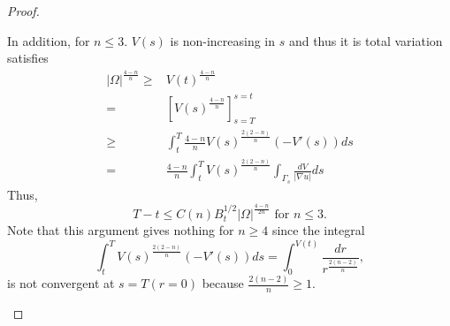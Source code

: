 \documentclass[paper=a4, fontsize=11pt]{scrartcl} %
\numberwithin{equation}{section} %
\numberwithin{figure}{section} %
\numberwithin{table}{section} %
\numberwithin{exercise}{section}
\begin{document}
\begin{proof}
\begin{itemize}
 In addition, for $n\leq 3.$ $V(s)$ is non-increasing in $s$ and thus it is total variation 
 satisfies 
 \begin{align*}
 |\Omega|^{\frac{4-n}{n}} \geq & V(t)^{\frac{4-n}{n}}\\
 {}=& \left[ V(s) ^{\frac{4-n}{n}}\right ]_{s=T} ^{s=t} \\
 {}\geq & \int_{t}^T \frac{4-n}{n} V(s) ^{\frac{2(2-n)}{n}} (-V'(s)) ds\\
 {}=&\frac{4-n}{n} \int_{t}^T V(s)^{\frac{2(2-n)}{n}} \int_{\Gamma_s} \frac{dV}{|\nabla u|} ds
 \end{align*}
 Thus, 
 $$T-t\leq C(n) B_t^{1/2} |\Omega|^{\frac{4-n}{2n}} \mbox{ for } n\leq 3.$$
 Note that this argument gives nothing for $n\geq 4$ since the integral 
 $$\int_{t}^T V(s)^{\frac{2(2-n)}{n}} (-V'(s))ds=\int_{0}^{V(t)} \frac{dr}{r^{\frac{2(n-2)}{n}}},$$
 is not convergent at $s=T( r=0)$ because $\frac{2(n-2)}{n}\geq 1.$
\end{itemize}
\end{proof}
\end{document}
